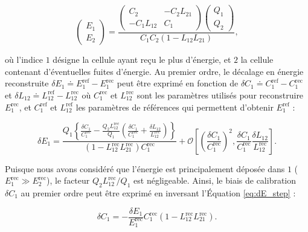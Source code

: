 \begin{equation}
    \label{eq:Erec_2_by_2_case}
  \left(
  \begin{matrix}
  E_1 \\
  E_2
  \end{matrix}\right)
 = \frac{\left(
  \begin{matrix}
    C_2 & -C_2L_{21} \\
    -C_1L_{12} & C_1
  \end{matrix}\right) \left(
  \begin{matrix}
    Q_1 \\
    Q_2
  \end{matrix}\right)}
  {C_1C_2(1 - L_{12}L_{21})},
\end{equation}

\bigbreak

où l'indice $1$ désigne la cellule ayant reçu le plus d'énergie, et $2$ la cellule contenant d'éventuelles fuites d'énergie. Au premier ordre, le décalage en énergie reconstruite $\delta E_1 \doteq E_1^{\textrm{ref}} - E_1^{\textrm{rec}}$ peut être exprimé en fonction de $\delta C_1 \doteq C_1^{\textrm{ref}} - C_1^{\textrm{rec}}$ et $\delta L_{12} \doteq L_{12}^{\textrm{ref}} - L_{12}^{\textrm{rec}}$ où $C_1^{\textrm{rec}}$ et $L_{12}^{\textrm{rec}}$ sont les paramètres utilisés pour reconstruire $E_1^{\textrm{rec}}$, et $C_1^{\textrm{ref}}$ et $L_{12}^{\textrm{ref}}$ les paramètres de références qui permettent d'obtenir $E_1^{\textrm{ref}}$ :

\begin{equation}
    \label{eq:dE_step}
  \delta E_1 = \frac{Q_1\left\{
  \frac{\delta C_1}{C_1^{\textrm{rec}}} - \frac{Q_2L_{12}^{\textrm{rec}}}{Q_1}\left(\frac{\delta C_1}{C_1^{\textrm{rec}}} + \frac{\delta L_{12}}{L_{12}^{\textrm{rec}}}\right)\right\}}{(1 - L^{\textrm{rec}}_{12}L^{\textrm{rec}}_{21})C_1^{\textrm{rec}}}
  + \mathcal{O}\left[
        \left(\frac{\delta C_1}{C_1^{\textrm{rec}}}\right)^{2}
        , \frac{\delta C_1}{C_1^{\textrm{rec}}}\frac{\delta L_{12}}{L_{12}^{\textrm{rec}}}
    \right].
\end{equation}

\bigbreak

Puisque nous avons considéré que l'énergie est principalement déposée dans $1$ ($E_1^{\textrm{rec}} \gg E_2^{\textrm{rec}}$), le facteur $Q_2L_{12}^{\textrm{rec}}/Q_1$ est négligeable. Ainsi, le biais de calibration $\delta C_1$ au premier ordre peut être exprimé en inversant l'\'Equation \ref{eq:dE_step} :

\begin{equation}
\label{eq:delta_C}
  \delta C_1 =  -\frac{\delta E_1}{E_1^{\textrm{rec}}}C_1^{\textrm{rec}}(1 - L_{12}^{\textrm{rec}}L_{21}^{\textrm{rec}}).
\end{equation}

